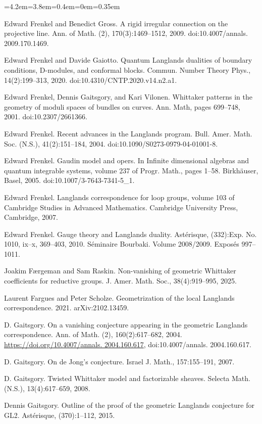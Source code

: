 \begin{list}{}{\leftmargin=4.2em=3.8em=0.4em\itemindent=0em\parsep=0.35em}
\item[{FG09c}] Edward Frenkel and Benedict Gross. A rigid irregular connection on the projective line. Ann. of Math. (2), 170(3):1469–1512, 2009. doi:10.4007/annals. 2009.170.1469.
\item[{FG20}] Edward Frenkel and Davide Gaiotto. Quantum Langlands dualities of boundary conditions, D-modules, and conformal blocks. Commun. Number Theory Phys., 14(2):199–313, 2020. doi:10.4310/CNTP.2020.v14.n2.a1.
\item[{FGV01}] Edward Frenkel, Dennis Gaitsgory, and Kari Vilonen. Whittaker patterns in the geometry of moduli spaces of bundles on curves. Ann. Math, pages 699–748, 2001. doi:10.2307/2661366.
\item[{Fre04}] Edward Frenkel. Recent advances in the Langlands program. Bull. Amer. Math. Soc. (N.S.), 41(2):151–184, 2004. doi:10.1090/S0273-0979-04-01001-8.
\item[{Fre05}] Edward Frenkel. Gaudin model and opers. In Infinite dimensional algebras and quantum integrable systems, volume 237 of Progr. Math., pages 1–58. Birkhäuser, Basel, 2005. doi:10.1007/3-7643-7341-5\_1.
\item[{Fre07}] Edward Frenkel. Langlands correspondence for loop groups, volume 103 of Cambridge Studies in Advanced Mathematics. Cambridge University Press, Cambridge, 2007.
\item[{Fre10}] Edward Frenkel. Gauge theory and Langlands duality. Astérisque, (332):Exp. No. 1010, ix–x, 369–403, 2010. Séminaire Bourbaki. Volume 2008/2009. Exposés 997–1011.
\item[{FrR25}] Joakim Færgeman and Sam Raskin. Non-vanishing of geometric Whittaker coefficients for reductive groups. J. Amer. Math. Soc., 38(4):919–995, 2025.
\item[{FS21}] Laurent Fargues and Peter Scholze. Geometrization of the local Langlands correspondence. 2021. arXiv:2102.13459.
\item[{Gai04}] D. Gaitsgory. On a vanishing conjecture appearing in the geometric Langlands correspondence. Ann. of Math. (2), 160(2):617–682, 2004. \url{https://doi.org/10.4007/annals. 2004.160.617}, doi:10.4007/annals. 2004.160.617.
\item[{Gai07}] D. Gaitsgory. On de Jong’s conjecture. Israel J. Math., 157:155–191, 2007.
\item[{Gai08}] D. Gaitsgory. Twisted Whittaker model and factorizable sheaves. Selecta Math. (N.S.), 13(4):617–659, 2008.
\item[{Gai15}] Dennis Gaitsgory. Outline of the proof of the geometric Langlands conjecture for GL2. Astérisque, (370):1–112, 2015.

\end{list}
